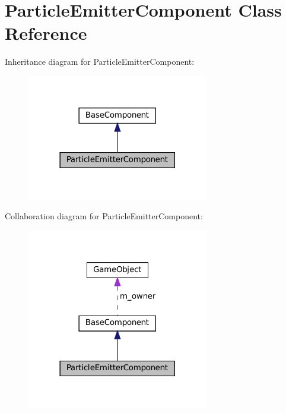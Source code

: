 \hypertarget{classParticleEmitterComponent}{}\section{Particle\+Emitter\+Component Class Reference}
\label{classParticleEmitterComponent}


Inheritance diagram for Particle\+Emitter\+Component\+:\nopagebreak
\begin{figure}[H]
\begin{center}
\leavevmode
\includegraphics[width=225pt]{classParticleEmitterComponent__inherit__graph}
\end{center}
\end{figure}


Collaboration diagram for Particle\+Emitter\+Component\+:\nopagebreak
\begin{figure}[H]
\begin{center}
\leavevmode
\includegraphics[width=225pt]{classParticleEmitterComponent__coll__graph}
\end{center}
\end{figure}
